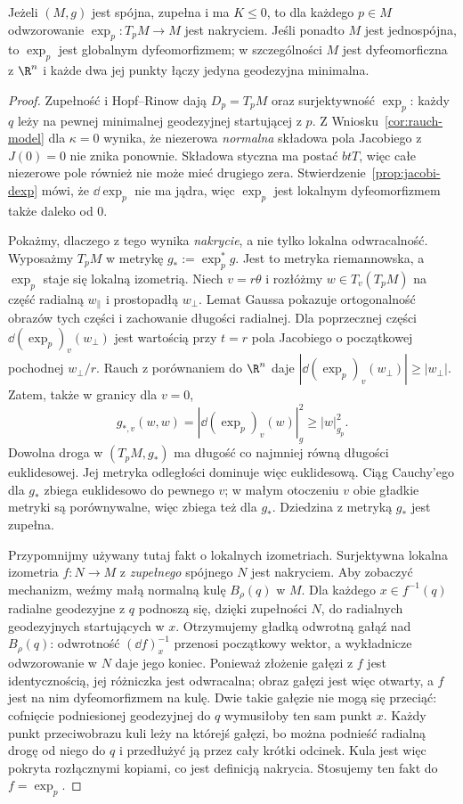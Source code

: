 \begin{twierdzenie}
\label{thm:cartan-hadamard}
Jeżeli $(M,g)$ jest spójna, zupełna i ma
$K\leq0$, to dla każdego $p\in M$
odwzorowanie
$\exp_p:T_pM\to M$ jest nakryciem.
Jeśli ponadto $M$ jest jednospójna, to
$\exp_p$ jest globalnym dyfeomorfizmem;
w szczególności $M$ jest dyfeomorficzna
z $\R^n$ i każde dwa jej punkty łączy
jedyna geodezyjna minimalna.
\end{twierdzenie}
\begin{proof}
Zupełność i Hopf--Rinow dają
$D_p=T_pM$ oraz surjektywność $\exp_p$:
każdy $q$ leży na pewnej minimalnej
geodezyjnej startującej z $p$.
Z Wniosku~\ref{cor:rauch-model} dla $\kappa=0$
wynika, że niezerowa \emph{normalna} składowa
pola Jacobiego z $J(0)=0$ nie znika ponownie.
Składowa styczna ma postać $btT$, więc całe
niezerowe pole również nie może mieć drugiego zera.
Stwierdzenie~\ref{prop:jacobi-dexp} mówi,
że $\dd\exp_p$ nie ma jądra, więc $\exp_p$
jest lokalnym dyfeomorfizmem także daleko od $0$.

Pokażmy, dlaczego z tego wynika \emph{nakrycie},
a nie tylko lokalna odwracalność.
Wyposażmy $T_pM$ w metrykę $g_*:=\exp_p^*g$.
Jest to metryka riemannowska, a $\exp_p$
staje się lokalną izometrią. Niech $v=r\theta$
i rozłóżmy $w\in T_v(T_pM)$ na część radialną
$w_\parallel$ i prostopadłą $w_\perp$.
Lemat Gaussa pokazuje ortogonalność obrazów
tych części i zachowanie długości radialnej.
Dla poprzecznej części
$\dd(\exp_p)_v(w_\perp)$ jest wartością
przy $t=r$ pola Jacobiego o początkowej
pochodnej $w_\perp/r$. Rauch z porównaniem
do $\R^n$ daje
$|\dd(\exp_p)_v(w_\perp)|\geq|w_\perp|$.
Zatem, także w granicy dla $v=0$,
\begin{equation}\label{eq:hadamard-exp-rozszerza}
 g_{*,v}(w,w)=|\dd(\exp_p)_v(w)|_g^2
 \geq |w|_{g_p}^2.
\end{equation}
Dowolna droga w $(T_pM,g_*)$ ma długość
co najmniej równą długości euklidesowej.
Jej metryka odległości dominuje więc
euklidesową. Ciąg Cauchy'ego dla $g_*$
zbiega euklidesowo do pewnego $v$;
w małym otoczeniu $v$ obie gładkie metryki
są porównywalne, więc zbiega też dla $g_*$.
Dziedzina z metryką $g_*$ jest zupełna.

Przypomnijmy używany tutaj fakt o lokalnych
izometriach. Surjektywna lokalna izometria
$f:N\to M$ z \emph{zupełnego} spójnego $N$
jest nakryciem. Aby zobaczyć mechanizm,
weźmy małą normalną kulę $B_\rho(q)$ w $M$.
Dla każdego $x\in f^{-1}(q)$ radialne geodezyjne
z $q$ podnoszą się, dzięki zupełności $N$,
do radialnych geodezyjnych startujących w $x$.
Otrzymujemy gładką odwrotną gałąź nad
$B_\rho(q)$: odwrotność $(\dd f)_x^{-1}$ przenosi
początkowy wektor, a wykładnicze odwzorowanie
w $N$ daje jego koniec. Ponieważ złożenie gałęzi z $f$
jest identycznością, jej różniczka jest odwracalna;
obraz gałęzi jest więc otwarty, a $f$ jest na nim
dyfeomorfizmem na kulę. Dwie takie gałęzie
nie mogą się przeciąć: cofnięcie podniesionej
geodezyjnej do $q$ wymusiłoby ten sam punkt $x$.
Każdy punkt przeciwobrazu kuli leży na którejś
gałęzi, bo można podnieść radialną drogę
od niego do $q$ i przedłużyć ją przez cały
krótki odcinek. Kula jest więc pokryta
rozłącznymi kopiami, co jest definicją nakrycia.
Stosujemy ten fakt do $f=\exp_p$.


\end{proof}
